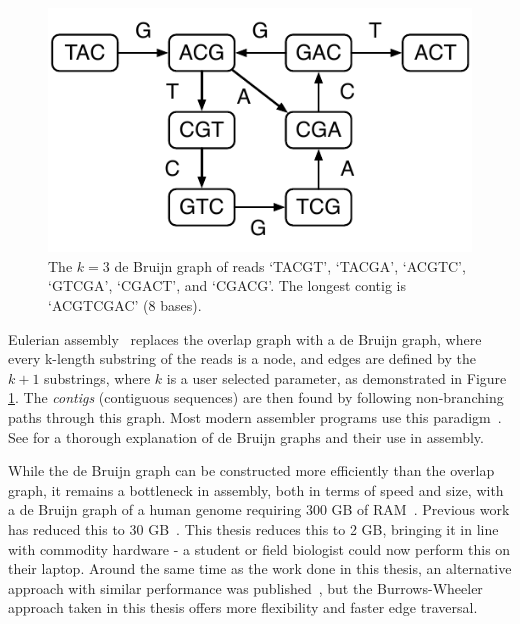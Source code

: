 

\begin{figure}
	\begin{center}
		\includegraphics[scale=0.7]{images/dbg.pdf}
		\caption{The $k=3$ de Bruijn graph of reads `TACGT', `TACGA', `ACGTC', `GTCGA', `CGACT', and
			`CGACG'. The longest contig is `ACGTCGAC' ($8$ bases).}
		\label{figure:dbg}
	\end{center}
\end{figure}


Eulerian assembly~\cite{IW95, PTW} replaces the overlap graph with a de Bruijn graph, where every k-length substring of the reads is a node, and edges are defined by the $k+1$ substrings, where $k$ is a user selected parameter, as demonstrated in Figure \ref{figure:dbg}. The \emph{contigs} (contiguous sequences) are then found by following non-branching paths through this graph. Most modern assembler programs use this paradigm~\cite{bankevich2012spades,peng2010idba,Li:2010,Simpson:2009,Butler:2008,SahShi12,MacPrz09,ZerBir08}. See \cite{compeau11} for a thorough explanation of de Bruijn graphs and their use in assembly.

While the de Bruijn graph can be constructed more efficiently than the overlap graph, it remains a bottleneck in assembly, both in terms of speed and size, with a de Bruijn graph of a human genome requiring 300 GB of RAM~\cite{Simpson:2009}. Previous work has reduced this to 30 GB~\cite{Conway}. This thesis reduces this to 2 GB, bringing it in line with commodity hardware - a student or field biologist could now perform this on their laptop. Around the same time as the work done in this thesis, an alternative approach with similar performance was published~\cite{wabi}, but the Burrows-Wheeler approach taken in this thesis offers more flexibility and faster edge traversal.

